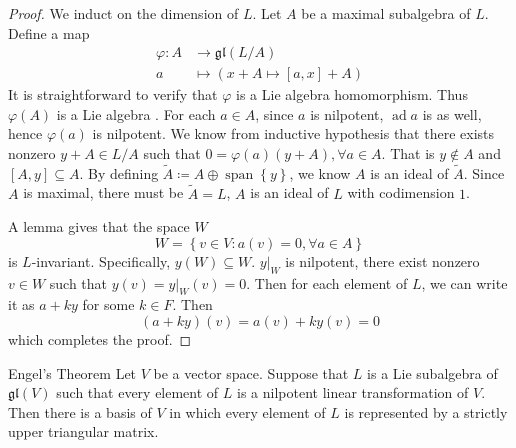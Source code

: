 \documentclass[../main.tex]{subfiles}
\begin{document}
\begin{proof}
    We induct on the dimension of \(  L  \).  Let \(  A  \) be a maximal subalgebra of \(  L  \). Define a map  \[
  \begin{aligned}
    \varphi : A&\to \mathfrak{gl}\left( L/A \right)  \\ 
     a & \mapsto \left( x+ A\mapsto [a,x]+ A \right) 
  \end{aligned}
    \]    It is straightforward to verify that \(   \varphi   \) is a Lie algebra homomorphism. Thus \(   \varphi \left( A \right)   \) is a Lie algebra . For each \(  a \in A  \), since \(  a   \) is nilpotent,   \(  \operatorname{ad}a  \) is as well, hence \(   \varphi \left( a \right)   \) is nilpotent. We know from inductive hypothesis that   there exists nonzero \(  y+ A\in L/A  \) such that  \( 0=    \varphi \left( a \right) \left( y+ A \right) , \forall a\in A  \). That is \(  y\not \in A  \) and  \(  [A,y]\subseteq A  \). By defining \(  \tilde{A}\coloneqq A\oplus \operatorname{span}\left\{ y \right\}   \), we know \(  A  \) is an ideal of \(  \tilde{A}  \). Since \(  A  \) is maximal, there must be \(  \tilde{A}= L  \), \(  A  \) is an ideal of \(  L  \) with codimension \(  1  \).
    
    A lemma gives that the space \(  W  \) \[
    W= \left\{ v\in V: a\left( v \right)= 0,\forall a\in A \right\}
    \] is \(  L  \)-invariant. Specifically, \(  y\left( W \right)\subseteq W   \). \(  y|_{W}  \) is nilpotent, there exist nonzero \(  v \in W  \) such that \(  y\left( v \right)= y|_{W}\left( v \right)= 0    \).     Then for each element of \(  L  \), we can write it as \(  a+ ky  \) for some \(  k \in F  \). Then \[
    \left( a+ ky \right)\left( v \right)= a\left( v \right)+ ky\left( v \right)    = 0
    \] which completes the proof.   
\end{proof}

\begin{theorem}{Engel's Theorem}{}
Let $V$ be a vector space. Suppose that $L$ is a Lie subalgebra of $\mathfrak{gl}(V)$ such that every element of $L$ is a nilpotent linear transformation of $V$. Then there is a basis of $V$ in which every element of $L$ is represented by a strictly upper triangular matrix.
\end{theorem}
\end{document}
